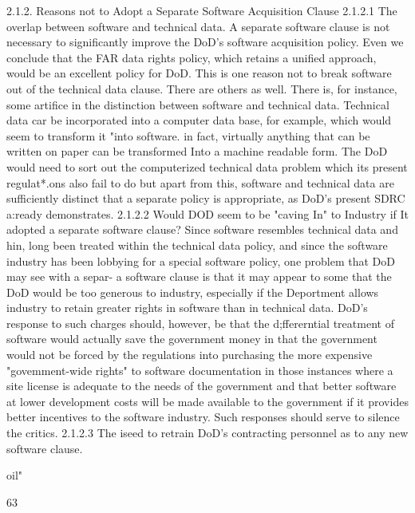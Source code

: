 \documentclass[12pt]{article}
\begin{document}
2.1.2. Reasons not to Adopt a Separate Software Acquisition Clause
2.1.2.1 The overlap between software and technical data.
A separate software clause is not necessary to significantly improve the DoD's software acquisition
policy. Even we conclude that the FAR data rights policy, which retains a unified approach, would be
an excellent policy for DoD. This is one reason not to break software out of the technical data clause.
There are others as well.
There is, for instance, some artifice in the distinction between software and technical data. Technical
data car be incorporated into a computer data base, for example, which would seem to transform it
"into software. in fact, virtually anything that can be written on paper can be transformed Into a
machine readable form. The DoD would need to sort out the computerized technical data problem
which its present regulat*.ons also fail to do but apart from this, software and technical data are
sufficiently distinct that a separate policy is appropriate, as DoD's present SDRC a:ready demonstrates.
2.1.2.2 Would DOD seem to be "caving In" to Industry if It adopted a separate software
clause?
Since software resembles technical data and hin, long been treated within the technical data policy,
and since the software industry has been lobbying for a special software policy, one problem that
DoD may see with a separ- a software clause is that it may appear to some that the DoD would be
too generous to industry, especially if the Deportment allows industry to retain greater rights in software than in technical data. DoD's response to such charges should, however, be that the d;ffererntial
treatment of software would actually save the government money in that the government would not
be forced by the regulations into purchasing the more expensive "govemment-wide rights" to software
documentation in those instances where a site license is adequate to the needs of the government
and that better software at lower development costs will be made available to the government if it
provides better incentives to the software industry. Such responses should serve to silence the
critics.
2.1.2.3 The iseed to retrain DoD's contracting personnel as to any new software clause.

oil"

63
\end{document}
